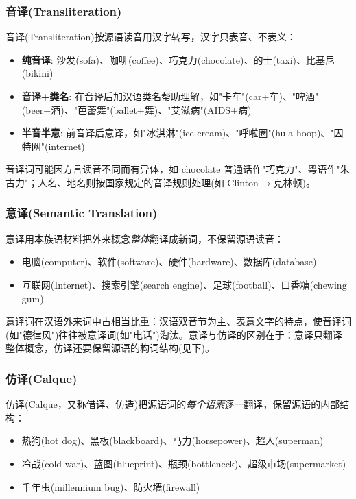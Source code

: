 \subsubsection{音译(Transliteration)}

音译(Transliteration)按源语读音用汉字转写，汉字只表音、不表义：
\begin{itemize}
    \item \textbf{纯音译}: 沙发(sofa)、咖啡(coffee)、巧克力(chocolate)、的士(taxi)、比基尼(bikini)
    \item \textbf{音译+类名}: 在音译后加汉语类名帮助理解，如"卡车"(car+车)、"啤酒"(beer+酒)、"芭蕾舞"(ballet+舞)、"艾滋病"(AIDS+病)
    \item \textbf{半音半意}: 前音译后意译，如"冰淇淋"(ice-cream)、"呼啦圈"(hula-hoop)、"因特网"(internet)
\end{itemize}

音译词可能因方言读音不同而有异体，如 chocolate 普通话作"巧克力"、粤语作"朱古力"；人名、地名则按国家规定的音译规则处理(如 Clinton$\rightarrow$克林顿)。

\subsubsection{意译(Semantic Translation)}

意译用本族语材料把外来概念\emph{整体}翻译成新词，不保留源语读音：
\begin{itemize}
    \item 电脑(computer)、软件(software)、硬件(hardware)、数据库(database)
    \item 互联网(Internet)、搜索引擎(search engine)、足球(football)、口香糖(chewing gum)
\end{itemize}

意译词在汉语外来词中占相当比重：汉语双音节为主、表意文字的特点，使音译词(如"德律风")往往被意译词(如"电话")淘汰。意译与仿译的区别在于：意译只翻译整体概念，仿译还要保留源语的构词结构(见下)。

\subsubsection{仿译(Calque)}

仿译(Calque，又称借译、仿造)把源语词的\emph{每个语素}逐一翻译，保留源语的内部结构：
\begin{itemize}
    \item 热狗(hot dog)、黑板(blackboard)、马力(horsepower)、超人(superman)
    \item 冷战(cold war)、蓝图(blueprint)、瓶颈(bottleneck)、超级市场(supermarket)
    \item 千年虫(millennium bug)、防火墙(firewall)
\end{itemize}

